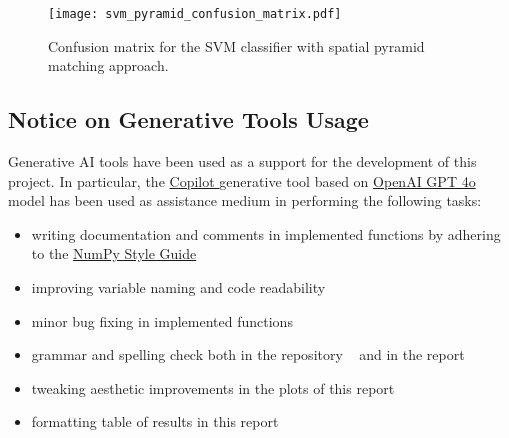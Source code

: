 \documentclass[../main.tex]{subfiles}
\begin{document}
\FloatBarrier

\begin{figure}[htb]
  \centering
  \texttt{[image: svm\_pyramid\_confusion\_matrix.pdf]}
  \caption{Confusion matrix for the SVM classifier with spatial pyramid matching
  approach.}\label{fig:confusion-matrix-pmk}
\end{figure}


\subsection{Notice on Generative Tools Usage}\label{app:generative-tools}

Generative AI tools have been used as a support for the development of this
project. In particular, the
\href{https://en.wikipedia.org/wiki/Microsoft_Copilot}{Copilot \faLink} generative tool
based on \href{https://en.wikipedia.org/wiki/GPT-4}{OpenAI GPT 4o \faLink} model has
been used as assistance medium in performing the following tasks:

\begin{itemize}
	 \item writing documentation and comments in implemented functions by
		 adhering to the
		 \href{https://numpydoc.readthedocs.io/en/latest/format.html}{NumPy
		 Style Guide \faLink}

	\item improving variable naming and code readability 
	
	\item minor bug fixing in implemented functions

	\item grammar and spelling check both in the repository
		~\cite{github} and in the report

	\item tweaking aesthetic improvements in the plots of this report

	\item formatting table of results in this report
\end{itemize}
\end{document}
